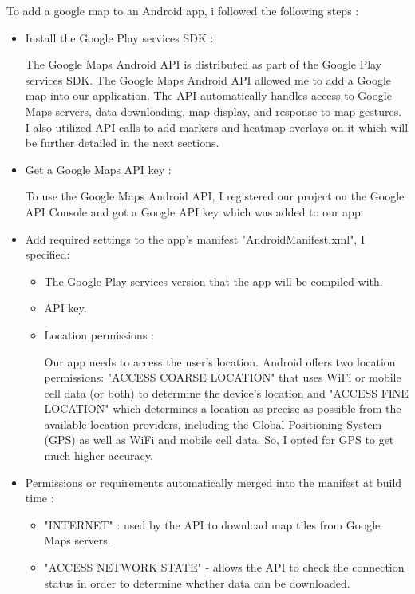 \documentclass[10pt,a4paper]{article} %
\begin{document}
	To add a google map to an Android app, i followed the following steps :
	\begin{itemize}
		\item Install the Google Play services SDK :
		
		The Google Maps Android API is distributed as part of the Google Play services SDK.
		The Google Maps Android API allowed me to add a Google map into our application. The API automatically handles access to Google Maps servers, data downloading, map display, and response to map gestures. I also utilized API calls to add markers and heatmap overlays on it which will be further detailed in the next sections.
		
		\item Get a Google Maps API key :
		
		To use the Google Maps Android API, I registered our project on the Google API Console and got a Google API key which was added to our app.
		\item Add required settings to the app's manifest "AndroidManifest.xml", I specified:
		
		\begin{itemize}
		\item The Google Play services version that the app will be compiled with.
		\item API key.
		\item Location permissions : 
		
		Our app needs to access the user's location. Android offers two location permissions: "ACCESS COARSE LOCATION" that uses WiFi or mobile cell data (or both) to determine the device's location and "ACCESS FINE LOCATION" which determines a location as precise as possible from the available location providers, including the Global Positioning System (GPS) as well as WiFi and mobile cell data. So, I opted for GPS to get much higher accuracy. 
		
		\end{itemize}
		
        \item Permissions or requirements automatically merged into the manifest at build time : 
        \begin{itemize} 
        \item "INTERNET" : used by the API to download map tiles from Google Maps servers.
        
        \item "ACCESS NETWORK STATE" - allows the API to check the connection status in order to determine whether data can be downloaded.
        

\end{itemize}
\end{itemize}
\end{document}
